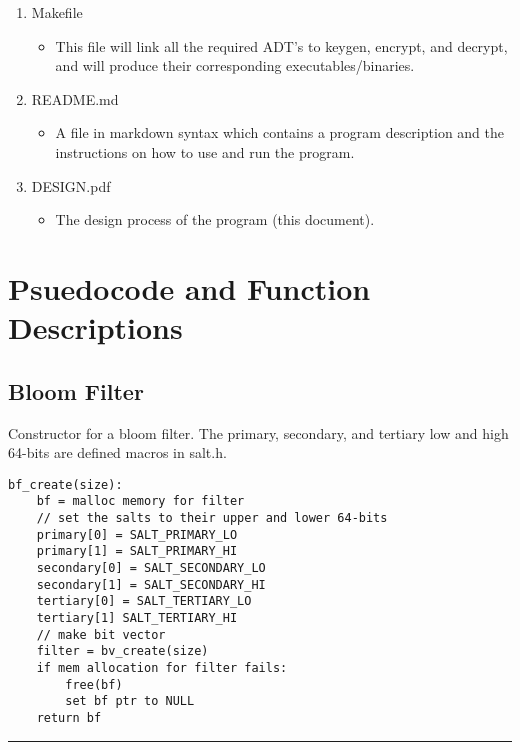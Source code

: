 \documentclass[
	12pt, %
]{fphw}
\begin{document}
\begin{enumerate}
	\item Makefile
	\begin{itemize}
		\item This file will link all the required ADT's to keygen, encrypt, and decrypt, and will produce their corresponding executables/binaries.
	\end{itemize}
		
	\item README.md
	\begin{itemize}
		\item A file in markdown syntax which contains a program description and the instructions on how to use and run the program.
	\end{itemize}
	
	\item DESIGN.pdf
	\begin{itemize}
		\item The design process of the program (this document).
	\end{itemize}
	
\end{enumerate}


\section{Psuedocode and Function Descriptions}

\subsection{Bloom Filter}

Constructor for a bloom filter. The primary, secondary, and tertiary low and high 64-bits are defined macros in salt.h.
\begin{lstlisting}[mathescape=true]
bf_create(size):
	bf = malloc memory for filter
	// set the salts to their upper and lower 64-bits
	primary[0] = SALT_PRIMARY_LO
	primary[1] = SALT_PRIMARY_HI
	secondary[0] = SALT_SECONDARY_LO
	secondary[1] = SALT_SECONDARY_HI
	tertiary[0] = SALT_TERTIARY_LO
	tertiary[1] SALT_TERTIARY_HI
	// make bit vector
	filter = bv_create(size)
	if mem allocation for filter fails:
		free(bf)
		set bf ptr to NULL
	return bf
\end{lstlisting}
\noindent\rule{6.3in}{0.4pt}
\end{document}
